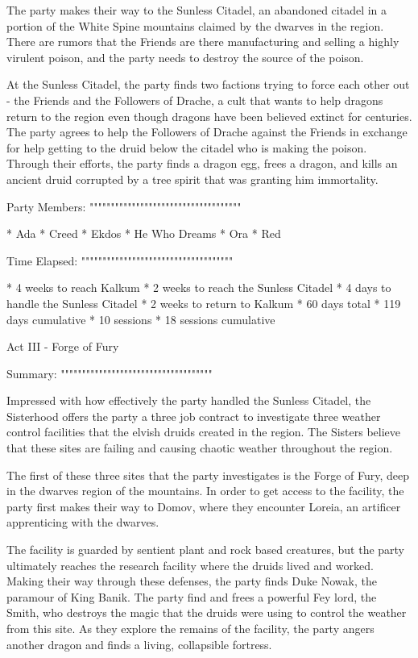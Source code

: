 The party makes their way to the Sunless Citadel, an abandoned citadel in a portion of the White Spine mountains claimed by the dwarves in the region.
There are rumors that the Friends are there manufacturing and selling a highly virulent poison, and the party needs to destroy the source of the poison.

At the Sunless Citadel, the party finds two factions trying to force each other out - the Friends and the Followers of Drache, a cult that wants to help dragons return to the region even though dragons have been believed extinct for centuries.
The party agrees to help the Followers of Drache against the Friends in exchange for help getting to the druid below the citadel who is making the poison.
Through their efforts, the party finds a dragon egg, frees a dragon, and kills an ancient druid corrupted by a tree spirit that was granting him immortality.

Party Members:
""""""""""""""""""""""""""""""""""""

  * Ada
  * Creed
  * Ekdos
  * He Who Dreams
  * Ora
  * Red

Time Elapsed:
""""""""""""""""""""""""""""""""""""

  * 4 weeks to reach Kalkum
  * 2 weeks to reach the Sunless Citadel
  * 4 days to handle the Sunless Citadel
  * 2 weeks to return to Kalkum
  * 60 days total
  * 119 days cumulative
  * 10 sessions
  * 18 sessions cumulative

Act III - Forge of Fury
^^^^^^^^^^^^^^^^^^^^^^^^^^^^^^^^^^^^

Summary:
""""""""""""""""""""""""""""""""""""

Impressed with how effectively the party handled the Sunless Citadel, the Sisterhood offers the party a three job contract to investigate three weather control facilities that the elvish druids created in the region.
The Sisters believe that these sites are failing and causing chaotic weather throughout the region.

The first of these three sites that the party investigates is the Forge of Fury, deep in the dwarves region of the mountains.
In order to get access to the facility, the party first makes their way to Domov, where they encounter Loreia, an artificer apprenticing with the dwarves.

The facility is guarded by sentient plant and rock based creatures, but the party ultimately reaches the research facility where the druids lived and worked.
Making their way through these defenses, the party finds Duke Nowak, the paramour of King Banik.
The party find and frees a powerful Fey lord, the Smith, who destroys the magic that the druids were using to control the weather from this site.
As they explore the remains of the facility, the party angers another dragon and finds a living, collapsible fortress.


